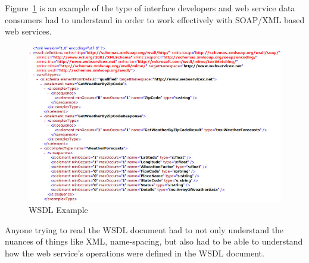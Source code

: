 Figure~\ref{f:wsdl-example}\cite{hid505mycodde2016} is an example of the type of
interface developers and web service data consumers had to understand in order
to work effectively with SOAP/XML based web services.  
\begin{figure}[!ht]
  \centering\includegraphics[width=\columnwidth]{images/wsdl-example.jpg}
  \caption{WSDL Example}\label{f:wsdl-example}
\end{figure}
Anyone trying to read the WSDL document had to not only understand the nuances 
of things like XML, name-spacing, but also had to be able to understand how the 
web service's operations were defined in the WSDL document.

